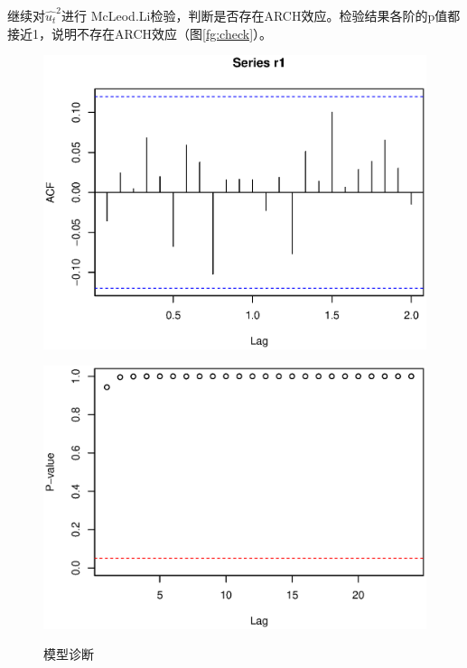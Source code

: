 \documentclass[10.5pt,onecolumn,a4paper]{article}%
\begin{document}
继续对$\hat{u_t}^2$进行 McLeod.Li检验，判断是否存在ARCH效应。检验结果各阶的p值都接近1，说明不存在ARCH效应（图\ref{fg:check}）。

\begin{figure}
\caption{模型诊断} \label{fg:check}
\begin{multicols}{2}
    \begin{minipage}[h]{0.5\textwidth} 
        \centering   
        \includegraphics[width=1\textwidth]{pic/acfr1.eps}   
           \label{fig:acfr1}   
    \end{minipage}
    \begin{minipage}[h]{0.5\textwidth}   
        \centering   
        \includegraphics[width=1\textwidth]{pic/mc_gr_ast.eps} 
        \label{fig:mcgrast}   
    \end{minipage}
\end{multicols}
\end{figure}
\end{document}
